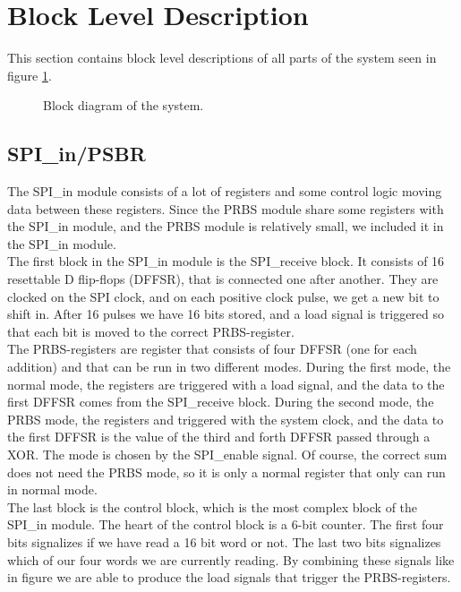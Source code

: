 \section{Block Level Description} \label{sec:block_level}
This section contains block level descriptions of all parts of the system seen in figure \ref{fig:top_level}.

\begin{figure}[H]
  \centering
  \captionsetup{justification=centering}
  \caption{Block diagram of the system.} \label{fig:top_level}
\end{figure}


\subsection{SPI\_in/PSBR}
The SPI\_in module consists of a lot of registers and some control logic moving data between these registers. Since the PRBS module share some registers with the SPI\_in module, and the PRBS module is relatively small, we included it in the SPI\_in module. \\
The first block in the SPI\_in module is the SPI\_receive block. It consists of 16 resettable D flip-flops (DFFSR), that is connected one after another. They are clocked on the SPI clock, and on each positive clock pulse, we get a new bit to shift in. After 16 pulses we have 16 bits stored, and a load signal is triggered so that each bit is moved to the correct PRBS-register. \\
The PRBS-registers are register that consists of four DFFSR (one for each addition) and that can be run in two different modes. During the first mode, the normal mode, the registers are triggered with a load signal, and the data to the first DFFSR comes from the SPI\_receive block. During the second mode, the PRBS mode, the registers and triggered with the system clock, and the data to the first DFFSR is the value of the third and forth DFFSR passed through a XOR. The mode is chosen by the SPI\_enable signal. Of course, the correct sum does not need the PRBS mode, so it is only a normal register that only can run in normal mode.\\
The last block is the control block, which is the most complex block of the SPI\_in module. The heart of the control block is a 6-bit counter. The first four bits signalizes if we have read a 16 bit word or not. The last two bits signalizes which of our four words we are currently reading. By combining these signals like in figure we are able to produce the load signals that trigger the PRBS-registers.

